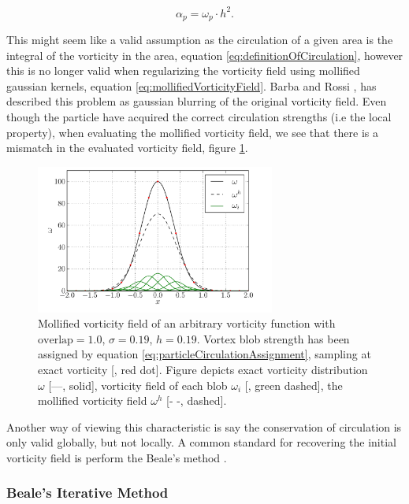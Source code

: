	\begin{equation}
	\alpha_p = \omega_p\cdot h^2.
	\label{eq:particleCirculationAssignment}
	\end{equation}

This might seem like a valid assumption as the circulation of a given area is the integral of the vorticity in the area, equation \ref{eq:definitionOfCirculation}, however this is no longer valid when regularizing the vorticity field using mollified gaussian kernels, equation \ref{eq:mollifiedVorticityField}. Barba and Rossi \cite{Barba2010}, has described this problem as gaussian blurring of the original vorticity field. Even though the particle have acquired the correct circulation strengths (i.e the local property), when evaluating the mollified vorticity field, we see that there is a mismatch in the evaluated vorticity field, figure \ref{fig:particleInitialization}. 


	\begin{figure}[t]
	\centering
	\includegraphics[width=0.7\textwidth]{figures/lagrangian/particleInitialization.pdf}
	\caption{Mollified vorticity field of an arbitrary vorticity function with $\mathrm{overlap}=1.0$, $\sigma=0.19$, $h=0.19$. Vortex blob strength has been assigned by equation \ref{eq:particleCirculationAssignment}, sampling at exact vorticity [{\color{plotRed}{$\bullet$}}, red dot]. Figure depicts exact vorticity distribution $\omega$ [---, solid], vorticity field of each blob $\omega_i$ [{\color{darkgreen}{---}}, green dashed], the mollified vorticity field $\omega^h$ [- -, dashed].  }
	\label{fig:particleInitialization}
	\end{figure}

Another way of viewing this characteristic is say the conservation of circulation is only valid globally, but not locally. A common standard for recovering the initial vorticity field is perform the Beale's method \cite{Beale1988}.

\subsubsection*{Beale's Iterative Method}

